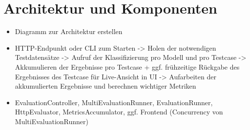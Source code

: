 \section{Architektur und Komponenten}\label{sec:architektur-und-komponenten}

\begin{itemize}
    \item Diagramm zur Architektur erstellen
    \item HTTP-Endpunkt oder CLI zum Starten -> Holen der notwendigen Testdatensätze -> Aufruf der Klassifizierung pro Modell und pro Testcase -> Akkumulieren der Ergebnisse pro Testcase + ggf. frühzeitige Rückgabe des Ergebnisses des Testcase für Live-Ansicht in UI -> Aufarbeiten der akkumulierten Ergebnisse und berechnen wichtiger Metriken
    \item EvaluationController, MultiEvaluationRunner, EvaluationRunner, HttpEvaluator, MetricsAccumulator, ggf. Frontend (Concurrency von MultiEvaluationRunner)
\end{itemize}
